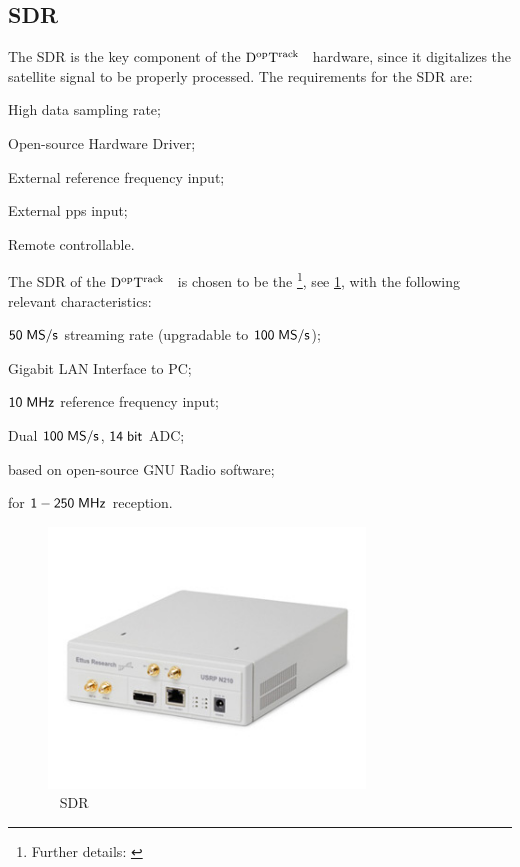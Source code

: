\documentclass[11pt,a4paper,oneside]{article}
\newcommand{\GroundStationName}{${\rm D^{\rm op}T^{\rm rack}}$}
\newcommand{\semitextwidth}{0.75\textwidth}
\newcommand{\listskip}{0pt}
\newenvironment{itemize*}
{\begin{itemize}
  \setlength{\itemsep}{\listskip}
  \setlength{\parskip}{\listskip}
  \setlength{\parsep}{\listskip}}
{\end{itemize}}
\newcommand{\unit}[2]{$ {\sf #1}\thickspace{\sf #2}$}
\begin{document}
\subsection{\acs{SDR}}

The \ac{SDR} is the key component of the \GroundStationName~ hardware, since it digitalizes the satellite signal to be properly processed. The requirements for the \ac{SDR} are:

\begin{itemize*}
\item High data sampling rate;
\item Open-source Hardware Driver;
\item External reference frequency input;
\item External \ac{pps} input;
\item Remote controllable.
\end{itemize*}

The \ac{SDR} of the \GroundStationName~ is chosen to be the \modelsdr\footnote{Further details: \href{\specssdr}{\specssdrshorturl}}, see \ref{fig:sdr}, with the following relevant characteristics:

\begin{itemize*}
\item \unit{50}{MS/s} streaming rate (upgradable to \unit{100}{MS/s});
\item Gigabit \ac{LAN} Interface to \ac{PC};
\item \unit{10}{MHz} reference frequency input;
\item Dual \unit{100}{MS/s}, \unit{14}{bit} \ac{ADC};
\item based on open-source GNU Radio software;
\item \modelsdrdb for \unit{1-250}{MHz} reception.
\end{itemize*}

\begin{figure}[!ht]
\centering
\includegraphics[width=\semitextwidth]{sdr}
\caption{\modelsdr ~ \acl{SDR}}
\label{fig:sdr}
\end{figure}
\end{document}
